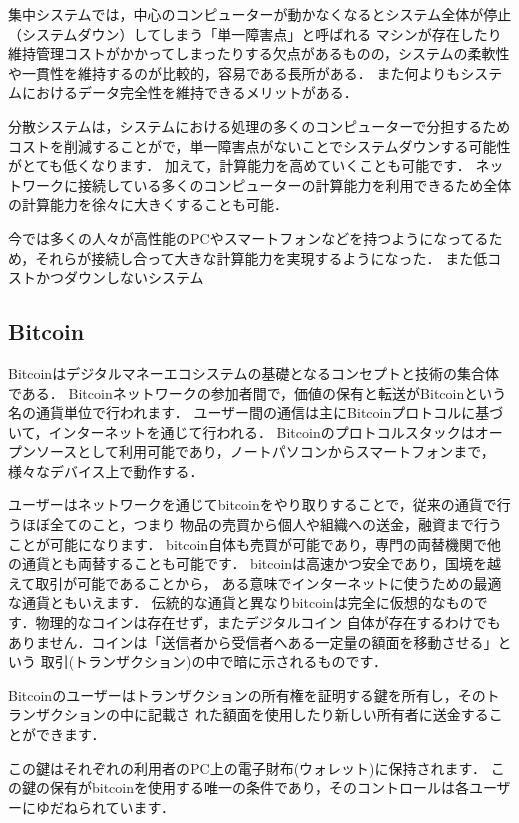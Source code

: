\documentclass[a4paper,12pt]{jsarticle}
\begin{document}
集中システムでは，中心のコンピューターが動かなくなるとシステム全体が停止（システムダウン）してしまう「単一障害点」と呼ばれる
マシンが存在したり維持管理コストがかかってしまったりする欠点があるものの，システムの柔軟性や一貫性を維持するのが比較的，容易である長所がある．
また何よりもシステムにおけるデータ完全性を維持できるメリットがある．

分散システムは，システムにおける処理の多くのコンピューターで分担するためコストを削減することがで，単一障害点がないことでシステムダウンする可能性がとても低くなります．
加えて，計算能力を高めていくことも可能です．
ネットワークに接続している多くのコンピューターの計算能力を利用できるため全体の計算能力を徐々に大きくすることも可能．

今では多くの人々が高性能のPCやスマートフォンなどを持つようになってるため，それらが接続し合って大きな計算能力を実現するようになった．
また低コストかつダウンしないシステム

\subsection{Bitcoin}
Bitcoinはデジタルマネーエコシステムの基礎となるコンセプトと技術の集合体である．
Bitcoinネットワークの参加者間で，価値の保有と転送がBitcoinという名の通貨単位で行われます．
ユーザー間の通信は主にBitcoinプロトコルに基づいて，インターネットを通じて行われる．
Bitcoinのプロトコルスタックはオープンソースとして利用可能であり，ノートパソコンからスマートフォンまで，様々なデバイス上で動作する．

ユーザーはネットワークを通じてbitcoinをやり取りすることで，従来の通貨で行うほぼ全てのこと，つまり
物品の売買から個人や組織への送金，融資まで行うことが可能になります．
bitcoin自体も売買が可能であり，専門の両替機関で他の通貨とも両替することも可能です．
bitcoinは高速かつ安全であり，国境を越えて取引が可能であることから，
ある意味でインターネットに使うための最適な通貨ともいえます．
伝統的な通貨と異なりbitcoinは完全に仮想的なものです．物理的なコインは存在せず，またデジタルコイン
自体が存在するわけでもありません．コインは「送信者から受信者へある一定量の額面を移動させる」という
取引(トランザクション)の中で暗に示されるものです．

Bitcoinのユーザーはトランザクションの所有権を証明する鍵を所有し，そのトランザクションの中に記載さ
れた額面を使用したり新しい所有者に送金することができます．

この鍵はそれぞれの利用者のPC上の電子財布(ウォレット)に保持されます．
この鍵の保有がbitcoinを使用する唯一の条件であり，そのコントロールは各ユーザーにゆだねられています．
\end{document}
